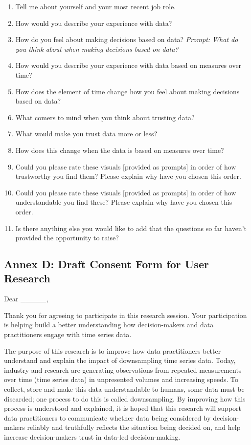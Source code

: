 \documentclass[
]{article}
\begin{document}
\begin{enumerate}
\def\labelenumi{\arabic{enumi}.}
\item
  Tell me about yourself and your most recent job role.
\item
  How would you describe your experience with data?
\item
  How do you feel about making decisions based on data? \emph{Prompt:
  What do you think about when making decisions based on data?}
\item
  How would you describe your experience with data based on measures
  over time?
\item
  How does the element of time change how you feel about making
  decisions based on data?
\item
  What comers to mind when you think about trusting data?
\item
  What would make you trust data more or less?
\item
  How does this change when the data is based on measures over time?
\item
  Could you please rate these visuals {[}provided as prompts{]} in order
  of how trustworthy you find them? Please explain why have you chosen
  this order.
\item
  Could you please rate these visuals {[}provided as prompts{]} in order
  of how understandable you find these? Please explain why have you
  chosen this order.
\item
  Is there anything else you would like to add that the questions so far
  haven't provided the opportunity to raise?
\end{enumerate}

\newpage

\hypertarget{annex-d-draft-consent-form-for-user-research}{%
\subsection{Annex D: Draft Consent Form for User
Research}\label{annex-d-draft-consent-form-for-user-research}}

Dear \_\_\_\_\_,

Thank you for agreeing to participate in this research session. Your
participation is helping build a better understanding how
decision-makers and data practitioners engage with time series data.

The purpose of this research is to improve how data practitioners better
understand and explain the impact of downsampling time series data.
Today, industry and research are generating observations from repeated
measurements over time (time series data) in unpresented volumes and
increasing speeds. To collect, store and make this data understandable
to humans, some data must be discarded; one process to do this is called
downsampling. By improving how this process is understood and explained,
it is hoped that this research will support data practitioners to
communicate whether data being considered by decision-makers reliably
and truthfully reflects the situation being decided on, and help
increase decision-makers trust in data-led decision-making.
\end{document}
